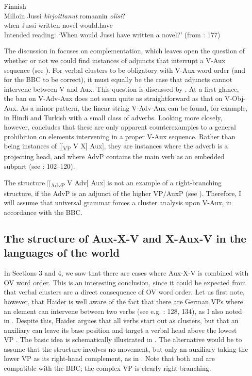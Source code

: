 \documentclass[output=paper, colorlinks, citecolor=brown]{langscibook}
\begin{document}
\ex Finnish\label{ex:sangfelt:29b}\\
\gll * Milloin Jussi \textit{kirjoittanut} {romaanin} \textit{olisi}? \\
 {} when Jussi written novel would.have\\
\glt Intended reading: ‘When would Jussi have written a novel?’ (from \citealt{BiberauerEtAl2014}: 177)\\
\z 
\z 


The discussion in \citet{BiberauerEtAl2014} focuses on complementation, which leaves open the question of whether or not we could find instances of adjuncts that interrupt a V-Aux sequence (see ). For verbal clusters to be obligatory with V-Aux word order (and for the BBC to be correct), it must equally be the case that adjuncts cannot intervene between V and Aux. This question is discussed by \citet{Sheehan2017Final}. At a first glance, the ban on V-Adv-Aux does not seem quite as straightforward as that on V-Obj-Aux. As a minor pattern, the linear string V-Adv-Aux can be found, for example, in Hindi and Turkish with a small class of adverbs. Looking more closely, however, \citet{Sheehan2017Final} concludes that these are only apparent counterexamples to a general prohibition on elements intervening in a proper V-Aux sequence. Rather than being instances of [[\textsubscript{VP} V X] Aux], they are instances where the adverb is a projecting head, and where AdvP contains the main verb as an embedded subpart (see \citealt{Sheehan2017Final}: 102–120).


The structure [[\textsubscript{AdvP} V Adv] Aux] is not an example of a right-branching structure, if the AdvP is an adjunct of the higher VP/AuxP (see \citealt{Haider2013}). Therefore, I will assume that universal grammar forces a cluster analysis upon V-Aux, in accordance with the BBC. 


\subsection{The structure of Aux-X-V and X-Aux-V in the languages of the world}\label{sec:sangfelt:5.2}

In Sections 3 and 4, we saw that there are cases where Aux-X-V is combined with OV word order. This is an interesting conclusion, since it could be expected from \citet{Haider2010} that verbal clusters are a direct consequence of OV word order. Let us first note, however, that Haider is well aware of the fact that there are German VPs where an element can intervene between two verbs (see e.g. \citealt{Haider2013}: 128, 134), as I also noted in . Despite this, Haider argues that all verbs start out as clusters, but that an auxiliary can leave its base position and target a verbal head above the lowest VP \parencites[290–291]{Haider2010}[134]{Haider2013}. The basic idea is schematically illustrated in . The alternative would be to assume that the structure involves no movement, but only an auxiliary taking the lower VP as its right-hand complement, as in . Note that both  and  are compatible with the BBC; the complex VP is clearly right-branching.
\end{document}
